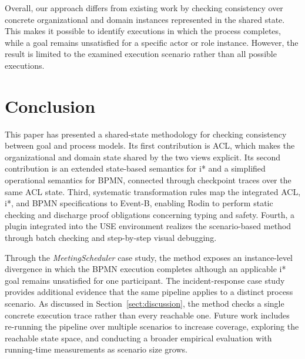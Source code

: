 \documentclass[a4paper, conference]{IEEEtran}
\begin{document}
Overall, our approach differs from existing work by checking consistency over concrete organizational and domain instances represented in the shared state. This makes it possible to identify executions in which the process completes, while a goal remains unsatisfied for a specific actor or role instance. However, the result is limited to the examined execution scenario rather than all possible executions.


\section{Conclusion}
\label{sect:conclusion}

This paper has presented a shared-state methodology for checking consistency between goal and process models. Its first contribution is ACL, which makes the organizational and domain state shared by the two views explicit. Its second contribution is an extended state-based semantics for i* and a simplified operational semantics for BPMN, connected through checkpoint traces over the same ACL state. Third, systematic transformation rules map the integrated ACL, i*, and BPMN specifications to Event-B, enabling Rodin to perform static checking and discharge proof obligations concerning typing and safety. Fourth, a plugin integrated into the USE environment realizes the scenario-based method through batch checking and step-by-step visual debugging.

Through the \textit{MeetingScheduler} case study, the method exposes an instance-level divergence in which the BPMN execution completes although an applicable i* goal remains unsatisfied for one participant. The incident-response case study provides additional evidence that the same pipeline applies to a distinct process scenario. As discussed in Section~\ref{sect:discussion}, the method checks a single concrete execution trace rather than every reachable one. Future work includes re-running the pipeline over multiple scenarios to increase coverage, exploring the reachable state space, and conducting a broader empirical evaluation with running-time measurements as scenario size grows.

\balance


\end{document}
